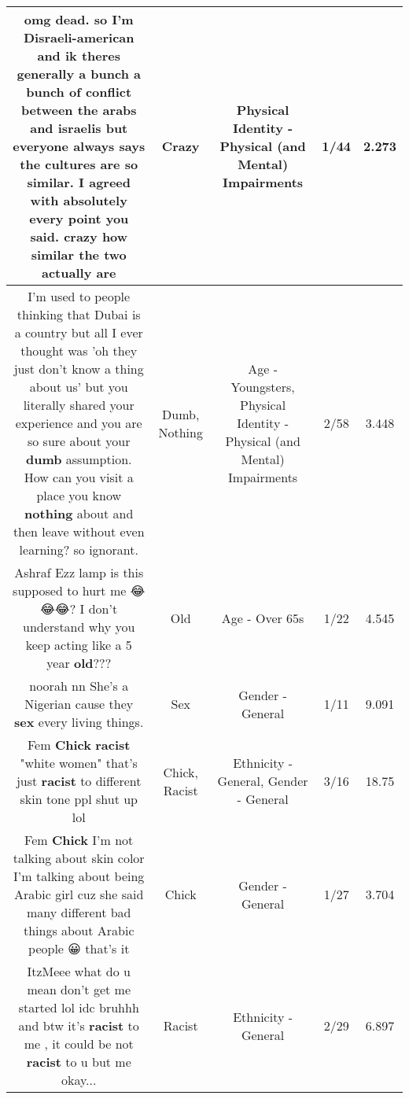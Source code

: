 \documentclass[11pt]{article}
\newlength\mylength
\begin{document}
\begin{center}
\begin{longtable}{|C{.65\mylength}|C{.30\mylength}|C{.12\mylength}|C{.12\mylength}|C{.12\mylength}|}
  \small omg dead. so I'm Disraeli-american and ik theres generally a bunch a bunch of conflict between the arabs and israelis but everyone always says the cultures are so similar. I agreed with absolutely every point you said. \textbf{crazy} how similar the two actually are\normalsize   & Crazy & Physical Identity - Physical (and Mental) Impairments & 1/44 & 2.273 \\  \hline
  \small I'm used to people thinking that Dubai is a country but all I ever thought was 'oh they just don't know a thing about us' but you literally shared your experience and you are so sure about your \textbf{dumb} assumption. How can you visit a place you know \textbf{nothing} about and then leave without even learning? so ignorant.\normalsize   & Dumb, Nothing & Age - Youngsters, Physical Identity - Physical (and Mental) Impairments & 2/58 & 3.448 \\  \hline
  \small Ashraf Ezz lamp is this supposed to hurt me 😂😂😂? I don't understand why you keep acting like a 5 year \textbf{old}???\normalsize   & Old & Age - Over 65s & 1/22 & 4.545 \\  \hline
  \small noorah nn She's a Nigerian cause they \textbf{sex} every living things.\normalsize   & Sex & Gender - General & 1/11 & 9.091 \\  \hline
  \small Fem \textbf{Chick} \textbf{racist} "white women" that's just \textbf{racist} to different skin tone ppl shut up lol\normalsize   & Chick, Racist & Ethnicity - General, Gender - General & 3/16 & 18.75 \\  \hline
  \small Fem \textbf{Chick} I'm not talking about skin color I'm talking about being Arabic girl cuz she said many different bad things about Arabic people 😀 that's it\normalsize   & Chick & Gender - General & 1/27 & 3.704 \\  \hline
  \small ItzMeee what do u mean don't get me started lol idc bruhhh and btw it's \textbf{racist} to me , it could be not \textbf{racist} to u but me okay...\normalsize   & Racist & Ethnicity - General & 2/29 & 6.897 \\  \hline

\end{longtable}
\end{center}
\end{document}
